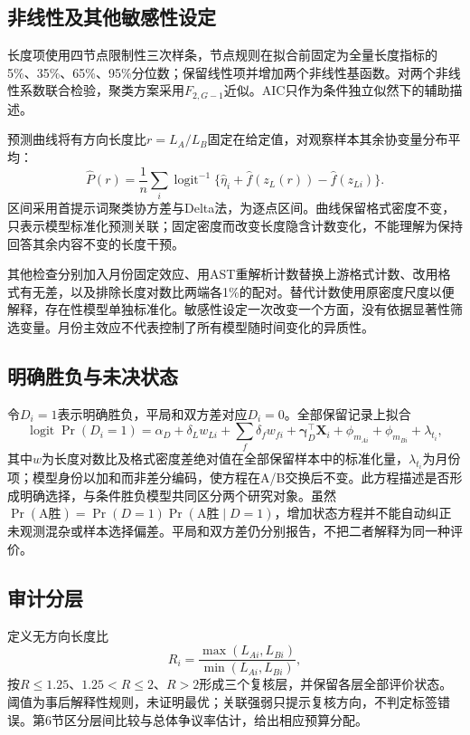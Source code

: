 \documentclass[UTF8,11pt,a4paper,fontset=windows]{ctexart}
\numberwithin{equation}{section}
\begin{document}
\subsection{非线性及其他敏感性设定}
长度项使用四节点限制性三次样条\cite{harrell}，节点规则在拟合前固定为全量长度指标的5\%、35\%、65\%、95\%分位数；保留线性项并增加两个非线性基函数。对两个非线性系数联合检验，聚类方案采用$F_{2,G-1}$近似。AIC只作为条件独立似然下的辅助描述。

预测曲线将有方向长度比$r=L_A/L_B$固定在给定值，对观察样本其余协变量分布平均：
\begin{equation}
 \widehat P(r)=\frac1n\sum_i\operatorname{logit}^{-1}
 \{\widehat\eta_i+\widehat f(z_L(r))-\widehat f(z_{Li})\}.
\end{equation}
区间采用首提示词聚类协方差与Delta法，为逐点区间。曲线保留格式密度不变，只表示模型标准化预测关联；固定密度而改变长度隐含计数变化，不能理解为保持回答其余内容不变的长度干预。

其他检查分别加入月份固定效应、用AST重解析计数替换上游格式计数、改用格式有无差，以及排除长度对数比两端各1\%的配对。替代计数使用原密度尺度以便解释，存在性模型单独标准化。敏感性设定一次改变一个方面，没有依据显著性筛选变量。月份主效应不代表控制了所有模型随时间变化的异质性。

\subsection{明确胜负与未决状态}
令$D_i=1$表示明确胜负，平局和双方差对应$D_i=0$。全部保留记录上拟合
\begin{equation}
 \operatorname{logit}\Pr(D_i=1)=\alpha_D+\delta_Lw_{Li}
 +\sum_f\delta_fw_{fi}+\bm\gamma_D^\top\bm X_i
 +\phi_{m_{Ai}}+\phi_{m_{Bi}}+\lambda_{t_i},
\end{equation}
其中$w$为长度对数比及格式密度差绝对值在全部保留样本中的标准化量，$\lambda_{t_i}$为月份项；模型身份以加和而非差分编码，使方程在A/B交换后不变。此方程描述是否形成明确选择，与条件胜负模型共同区分两个研究对象。虽然$\Pr(\text{A胜})=\Pr(D=1)\Pr(\text{A胜}\mid D=1)$，增加状态方程并不能自动纠正未观测混杂或样本选择偏差。平局和双方差仍分别报告，不把二者解释为同一种评价。

\subsection{审计分层}
定义无方向长度比
\begin{equation}\label{eq:ratio}
 R_i=\frac{\max(L_{Ai},L_{Bi})}{\min(L_{Ai},L_{Bi})},
\end{equation}
按$R\leq1.25$、$1.25<R\leq2$、$R>2$形成三个复核层，并保留各层全部评价状态。阈值为事后解释性规则，未证明最优；关联强弱只提示复核方向，不判定标签错误。第6节区分层间比较与总体争议率估计，给出相应预算分配。
\end{document}
